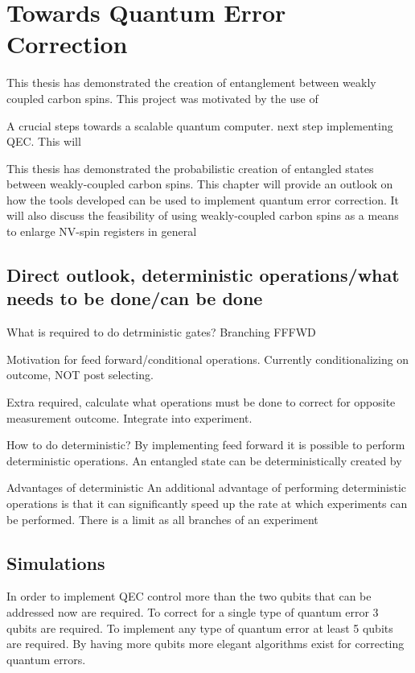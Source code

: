 \chapter{Towards Quantum Error Correction}
This thesis has demonstrated the creation of entanglement between weakly coupled carbon spins.
This project was motivated by the use of



A crucial steps towards a scalable quantum computer.
next step implementing QEC.
This will

This thesis has demonstrated the probabilistic creation of entangled states between weakly-coupled carbon spins.
This chapter will provide an outlook on how the tools developed can be used to implement quantum error correction.
It will also discuss the feasibility of using weakly-coupled carbon spins as a means to enlarge NV-spin registers in general

\section{Direct outlook, deterministic operations/what needs to be done/can be done}
What is required to do detrministic gates?
Branching
FFFWD

Motivation for feed forward/conditional operations.
Currently conditionalizing on outcome, NOT post selecting.

Extra required, calculate what operations must be done to correct for opposite measurement outcome.
Integrate into experiment.


How to do deterministic?
By implementing feed forward it is possible to perform deterministic operations.
An entangled state can be deterministically created by


Advantages of deterministic
An additional advantage of performing deterministic operations is that it can significantly speed up the rate at which experiments can be performed.
There is a limit as all branches of an experiment


\section{Simulations}
In order to implement QEC control more than the two qubits that can be addressed now are required.
To correct for a single type of quantum error 3 qubits are required.
To implement any type of quantum error at least 5 qubits are required.
By having more qubits more elegant algorithms exist for correcting quantum errors.


